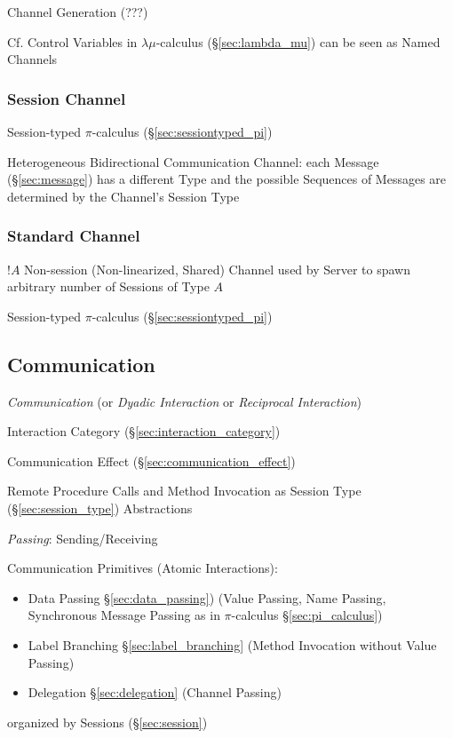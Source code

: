 Channel Generation (???)

\fist Cf. Control Variables in $\lambda\mu$-calculus
(\S\ref{sec:lambda_mu}) can be seen as Named Channels



\subsubsection{Session Channel}\label{sec:session_channel}

Session-typed $\pi$-calculus (\S\ref{sec:sessiontyped_pi})

Heterogeneous Bidirectional Communication Channel: each Message
(\S\ref{sec:message}) has a different Type and the possible Sequences
of Messages are determined by the Channel's Session Type
\cite{neubauer-thiemann04}



\subsubsection{Standard Channel}\label{sec:standard_channel}

$!A$ Non-session (Non-linearized, Shared) Channel used by Server to
spawn arbitrary number of Sessions of Type $A$

Session-typed $\pi$-calculus (\S\ref{sec:sessiontyped_pi})



\subsection{Communication}\label{sec:communication}

\emph{Communication} (or \emph{Dyadic Interaction} or \emph{Reciprocal
  Interaction})

Interaction Category (\S\ref{sec:interaction_category})

Communication Effect (\S\ref{sec:communication_effect})

Remote Procedure Calls and Method Invocation as Session Type
(\S\ref{sec:session_type}) Abstractions
\cite{honda-vasconcelos-kubo98}

\emph{Passing}: Sending/Receiving

Communication Primitives (Atomic Interactions):
\cite{honda-vasconcelos-kubo98}
\begin{itemize}
  \item Data Passing \S\ref{sec:data_passing}) (Value Passing, Name
    Passing, Synchronous Message Passing as in $\pi$-calculus
    \S\ref{sec:pi_calculus})
  \item Label Branching \S\ref{sec:label_branching} (Method Invocation
    without Value Passing)
  \item Delegation \S\ref{sec:delegation} (Channel Passing)
\end{itemize}
organized by Sessions (\S\ref{sec:session})


